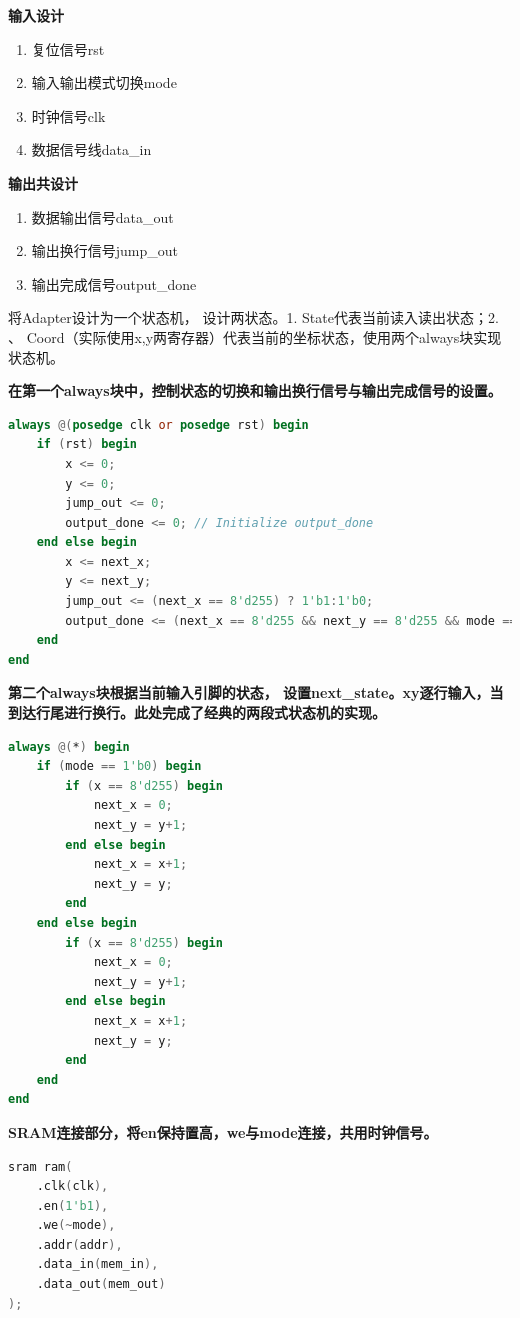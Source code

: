 \documentclass[12pt, a4paper]{article}
\begin{document}
\noindent\textbf{输入设计}
\begin{enumerate}
    \item 复位信号rst
    \item 输入输出模式切换mode
    \item 时钟信号clk
    \item 数据信号线data\_in
\end{enumerate}

\noindent\textbf{输出共设计}
\begin{enumerate}
    \item 数据输出信号data\_out
    \item 输出换行信号jump\_out
    \item 输出完成信号output\_done
\end{enumerate}

将Adapter设计为一个状态机， 设计两状态。1. State代表当前读入读出状态；2. 、
Coord（实际使用x,y两寄存器）代表当前的坐标状态，使用两个always块实现状态机。


\noindent\textbf{在第一个always块中，控制状态的切换和输出换行信号与输出完成信号的设置。}
\begin{lstlisting}[language=verilog]
always @(posedge clk or posedge rst) begin
    if (rst) begin
        x <= 0;
        y <= 0;
        jump_out <= 0;
        output_done <= 0; // Initialize output_done
    end else begin
        x <= next_x;
        y <= next_y;
        jump_out <= (next_x == 8'd255) ? 1'b1:1'b0;
        output_done <= (next_x == 8'd255 && next_y == 8'd255 && mode == 1'b1) ? 1'b1:0;
    end
end
\end{lstlisting}


\noindent\textbf{第二个always块根据当前输入引脚的状态， 设置next\_state。xy逐行输入，当到达行尾进行换行。此处完成了经典的两段式状态机的实现。}
\begin{lstlisting}[language=verilog]
always @(*) begin
    if (mode == 1'b0) begin
        if (x == 8'd255) begin
            next_x = 0;
            next_y = y+1;
        end else begin
            next_x = x+1;
            next_y = y;
        end
    end else begin
        if (x == 8'd255) begin
            next_x = 0;
            next_y = y+1;
        end else begin
            next_x = x+1;
            next_y = y;
        end
    end
end
\end{lstlisting}

\noindent\textbf{SRAM连接部分，将en保持置高，we与mode连接，共用时钟信号。}
\begin{lstlisting}[language=verilog]
sram ram(
    .clk(clk),
    .en(1'b1),
    .we(~mode),
    .addr(addr),
    .data_in(mem_in),
    .data_out(mem_out)
);
\end{lstlisting}
\end{document}
